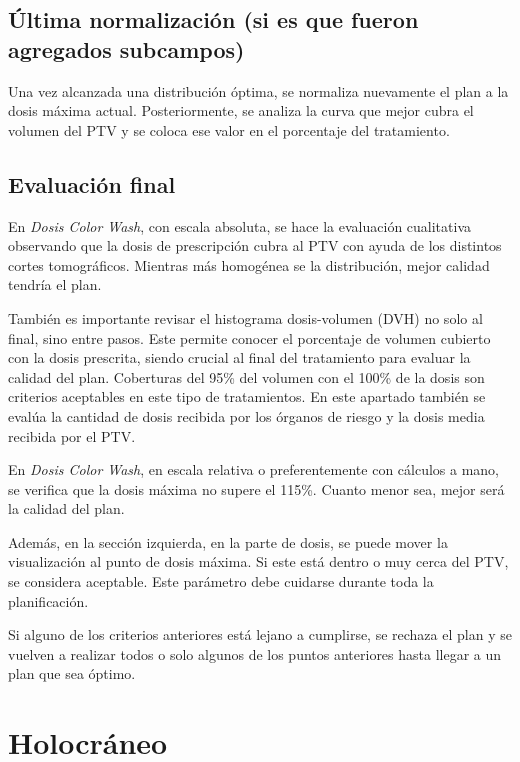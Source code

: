 \documentclass{article}
\begin{document}
\subsection{Última normalización (si es que fueron agregados subcampos)}

Una vez alcanzada una distribución óptima, se normaliza nuevamente el plan a la dosis máxima actual. Posteriormente, se analiza la curva que mejor cubra el volumen del PTV y se coloca ese valor en el porcentaje del tratamiento.

\subsection{Evaluación final}

En \textit{Dosis Color Wash}, con escala absoluta, se hace la evaluación cualitativa observando que la dosis de prescripción cubra al PTV con ayuda de los distintos cortes tomográficos. Mientras más homogénea se la distribución, mejor calidad tendría el plan.

También es importante revisar el histograma dosis-volumen (DVH) no solo al final, sino entre pasos. Este permite conocer el porcentaje de volumen cubierto con la dosis prescrita, siendo crucial al final del tratamiento para evaluar la calidad del plan. Coberturas del 95\% del volumen con el 100\% de la dosis son criterios aceptables en este tipo de tratamientos. En este apartado también se evalúa la cantidad de dosis recibida por los órganos de riesgo y la dosis media recibida por el PTV.

En \textit{Dosis Color Wash}, en escala relativa o preferentemente con cálculos a mano, se verifica que la dosis máxima no supere el 115\%. Cuanto menor sea, mejor será la calidad del plan.

Además, en la sección izquierda, en la parte de dosis, se puede mover la visualización al punto de dosis máxima. Si este está dentro o muy cerca del PTV, se considera aceptable. Este parámetro debe cuidarse durante toda la planificación.

Si alguno de los criterios anteriores está lejano a cumplirse, se rechaza el plan y se vuelven a realizar todos o solo algunos de los puntos anteriores hasta llegar a un plan que sea óptimo.

\vspace{3pt}

\section{Holocráneo}
\end{document}

